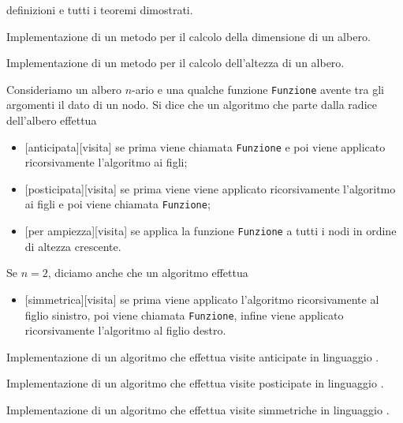 definizioni e tutti i teoremi dimostrati.
\begin{listing}
	\caption{Implementazione di un metodo  per il calcolo della dimensione di un albero.}
\end{listing}
\begin{listing}
	\caption{Implementazione di un metodo  per il calcolo dell'altezza di un albero.}
\end{listing}
\begin{Definition}
		Consideriamo un albero $n$-ario e una qualche funzione
    \texttt{Funzione} avente tra gli argomenti il dato di un nodo. Si
    dice che un algoritmo che parte dalla radice dell'albero effettua
\begin{itemize}
	\item {}[anticipata][visita] se prima viene chiamata
    \texttt{Funzione} e poi viene applicato ricorsivamente l'algoritmo ai
    figli;
	\item {}[posticipata][visita] se prima viene viene
    applicato ricorsivamente l'algoritmo ai figli e poi viene chiamata
    \texttt{Funzione};
	\item {}[per ampiezza][visita] se applica la
    funzione \texttt{Funzione} a tutti i nodi in ordine di altezza
    crescente.
\end{itemize}
  Se $n = 2$, diciamo anche che un algoritmo effettua
  \begin{itemize}
	  \item {}[simmetrica][visita] se prima viene applicato
      l'algoritmo ricorsivamente al figlio sinistro, poi viene chiamata
      \texttt{Funzione}, infine viene applicato ricorsivamente l'algoritmo
      al figlio destro.
  \end{itemize}
\end{Definition}
\begin{listing}
	\caption{Implementazione di un algoritmo che effettua visite anticipate in linguaggio .}
\end{listing}
\begin{listing}
	\caption{Implementazione di un algoritmo che effettua visite posticipate in linguaggio .}
\end{listing}
\begin{listing}
	\caption{Implementazione di un algoritmo che effettua visite simmetriche in linguaggio .}
\end{listing}
